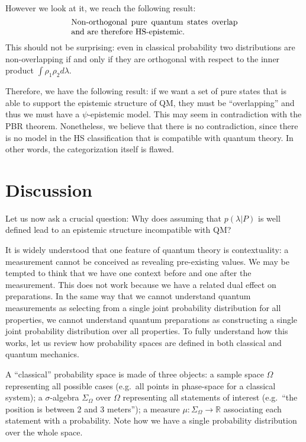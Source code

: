 \documentclass[twocolumn,prl,floatfix,superscriptaddress]{revtex4-2}
\begin{document}
However we look at it, we reach the following result:
\begin{align}\label{conclusion}
	\parbox{2.8in}{Non-orthogonal pure quantum states overlap and are therefore HS-epistemic.}
\end{align}
This should not be surprising: even in classical probability two distributions are non-overlapping if and only if they are orthogonal with respect to the inner product $\int \rho_1 \rho_2 d\lambda$.

Therefore, we have the following result: if we want a set of pure states that is able to support the epistemic structure of QM, they must be ``overlapping'' and thus we must have a $\psi$-epistemic model. This may seem in contradiction with the PBR theorem. Nonetheless, we believe that there is no contradiction, since there is no model in the HS classification that is compatible with quantum theory. In other words, the categorization itself is flawed.

\section{Discussion}

Let us now ask a crucial question: Why does assuming that $p(\lambda|P)$ is well defined lead to an epistemic structure incompatible with QM?

It is widely understood that one feature of quantum theory is contextuality: a measurement cannot be conceived as revealing pre-existing values. We may be tempted to think that we have one context before and one after the measurement. This does not work because we have a related dual effect on preparations. In the same way that we cannot understand quantum measurements as selecting from a single joint probability distribution for all properties, we cannot understand quantum preparations as constructing a single joint probability distribution over all properties. To fully understand how this works, let us review how probability spaces are defined in both classical and quantum mechanics.

A ``classical'' probability space is made of three objects: a sample space $\Omega$ representing all possible cases (e.g.\ all points in phase-space for a classical system); a $\sigma$-algebra $\Sigma_\Omega$ over $\Omega$  representing all statements of interest (e.g.\ ``the position is between 2 and 3 meters''); a measure $\mu : \Sigma_\Omega \to \mathbb{R}$ associating each statement with a probability. Note how we have a single probability distribution over the whole space.
\end{document}
